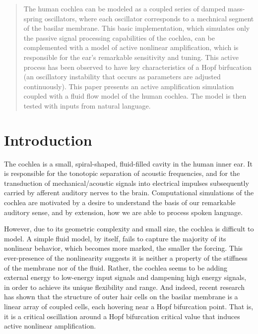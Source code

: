 \documentclass[12pt]{article}
\begin{document}
\maketitle

\begin{abstract}
The human cochlea can be modeled as a coupled series of damped mass-spring oscillators, where each oscillator corresponds to a mechnical segment of the basilar membrane. This basic implementation, which simulates only the passive signal processing capabilities of the cochlea, can be complemented with a model of active nonlinear amplification, which is responsible for the ear's remarkable sensitivity and tuning. This active process has been observed to have key characteristics of a Hopf birfucation (an oscillatory instability that occurs as parameters are adjusted continuously). This paper presents an active amplification simulation coupled with a fluid flow model of the human cochlea. The model is then tested with inputs from natural language. 
\end{abstract}
 

\section{Introduction}
The cochlea is a small, spiral-shaped, fluid-filled cavity in the human inner ear. It is responsible for the tonotopic separation of acoustic frequencies, and for the transduction of mechanical/acoustic signals into electrical impulses subsequently carried by afferent auditory nerves to the brain. Computational simulations of the cochlea are motivated by a desire to understand the basis of our remarkable auditory sense, and by extension, how we are able to process spoken language.
   
However, due to its geometric complexity and small size, the cochlea is difficult to model. A simple fluid model, by itself, fails to capture the majority of its nonlinear behavior, which becomes more marked, the smaller the forcing. This ever-presence of the nonlinearity suggests it is neither a property of the stiffness of the membrane nor of the fluid. Rather, the cochlea seems to be adding external energy to low-energy input signals and dampening high energy signals, in order to achieve its unique flexibility and range. And indeed, recent research has shown that the structure of outer hair cells on the basilar membrane is a linear array of coupled cells, each hovering near a Hopf bifurcation point. That is, it is a critical oscillation around a Hopf bifurcation critical value that induces active nonlinear amplification.
\end{document}
